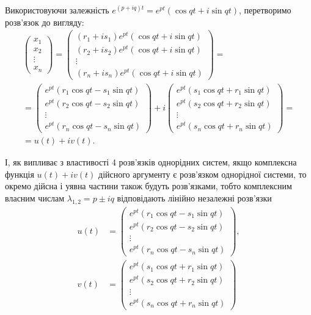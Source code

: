 \begin{enumerate}
Використовуючи залежність $e^{(p + i q) t} = e^{pt} (\cos qt + i \sin qt)$, перетворимо розв'язок до вигляду:
\begin{multline*}
	\begin{pmatrix} x_1 \\ x_2 \\ \vdots \\ x_n \end{pmatrix} =
	\begin{pmatrix} (r_1 + i s_1) e^{p t} (\cos qt + i \sin qt) \\ (r_2 + i s_2) e^{p t} (\cos qt + i \sin qt) \\ \vdots \\ (r_n + i s_n) e^{p t} (\cos qt + i \sin qt) \end{pmatrix} = \\
	= \begin{pmatrix} e^{p t} (r_1 \cos qt - s_1 \sin qt) \\ e^{pt} (r_2 \cos qt - s_2 \sin qt) \\ \vdots \\ e^{pt} (r_n \cos qt - s_n \sin qt) \end{pmatrix} + i \begin{pmatrix} e^{p t} (s_1 \cos qt + r_1 \sin qt) \\ e^{pt} (s_2 \cos qt + r_2 \sin qt) \\ \vdots \\ e^{pt} (s_n \cos qt + r_n \sin qt) \end{pmatrix} = \\
	= u(t) + i v(t).
\end{multline*}

І, як випливає з властивості 4 розв'язків однорідних систем, якщо комплексна функція $u(t) + i v(t)$ дійсного аргументу є розв'язком однорідної системи, то окремо дійсна і уявна частини також будуть розв'язками, тобто комплексним власним числам $\lambda_{1,2} = p \pm i q$  відповідають лінійно незалежні розв'язки
\begin{align*}
	u(t) &= \begin{pmatrix} e^{p t} (r_1 \cos qt - s_1 \sin qt) \\ e^{pt} (r_2 \cos qt - s_2 \sin qt) \\ \vdots \\ e^{pt} (r_n \cos qt - s_n \sin qt) \end{pmatrix}, \\
	v(t) &= \begin{pmatrix} e^{p t} (s_1 \cos qt + r_1 \sin qt) \\ e^{pt} (s_2 \cos qt + r_2 \sin qt) \\ \vdots \\ e^{pt} (s_n \cos qt + r_n \sin qt) \end{pmatrix}
\end{align*}


\end{enumerate}
